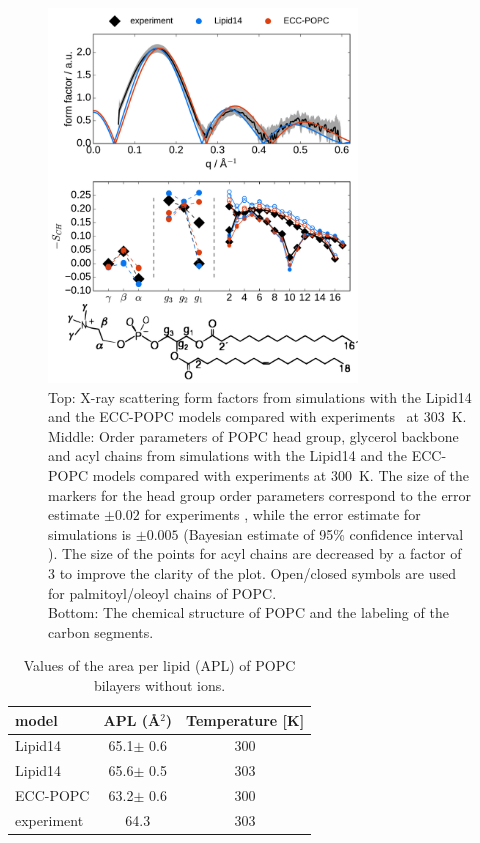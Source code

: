 \documentclass[journal=jpcbfk,manuscript=article]{achemso}
\begin{document}
\begin{figure}[tb!]
  \centering
  \includegraphics[width=8.2cm]{../Fig/ipython_nb/Order-parameters_form-factors_exp-L14-ECCL17_q80_sig89_POPC-struct.pdf}
  \caption{\label{simVSexpNOions}
    Top: X-ray scattering form factors from simulations with the Lipid14 \cite{dickson14} and
    the ECC-POPC models compared with experiments~\cite{kucerka11} at 303~K. \\
    Middle: Order parameters of POPC head group, glycerol backbone and acyl chains 
    from simulations with the Lipid14 \cite{dickson14} and the ECC-POPC models
    compared with experiments \cite{ferreira13} at 300~K.
    The size of the markers for the head group order parameters correspond to
    the error estimate $\pm 0.02$ for experiments \cite{botan15,ollila16},
    while the error estimate for simulations is $\pm 0.005$
    (Bayesian estimate of 95\% confidence interval \cite{scipy}).
    The size of the points for acyl chains are decreased by a factor of 3 to improve the clarity of the plot.
    Open/closed symbols are used for palmitoyl/oleoyl chains of POPC. \\
    Bottom: The chemical structure of POPC and the labeling of the carbon segments.
  } 
\end{figure}

\begin{table}[tb!]
  \caption{Values of the area per lipid (APL) of POPC bilayers without ions. \label{tab:apls}
  }
  \begin{tabular}{l|c c}
    model          & APL (\AA$^2$)   & Temperature [K] \\
    \hline
    Lipid14                   & 65.1$\pm$ 0.6  &  300 \\
    Lipid14 \cite{dickson14}  & 65.6$\pm$ 0.5  &  303 \\
    \hline
    ECC-POPC                & 63.2$\pm$ 0.6  &  300       \\
    \hline
    experiment \cite{kucerka11} & 64.3  &  303    \\
    \hline
  \end{tabular}
\end{table}
\end{document}
